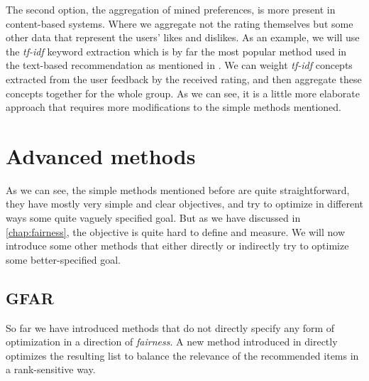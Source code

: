 The second option, the aggregation of mined preferences, is more present in content-based systems. Where we aggregate not the rating themselves but some other data that represent the users' likes and dislikes. As an example, we will use the \textit{tf-idf} keyword extraction which is by far the most popular method used in the text-based recommendation as mentioned in \cite{beel_2016_rs_literature_survey}. We can weight \textit{tf-idf} concepts extracted from the user feedback by the received rating, and then aggregate these concepts together for the whole group. As we can see, it is a little more elaborate approach that requires more modifications to the simple methods mentioned.


\section{Advanced methods}\label{sec:03_advanced_methods}
As we can see, the simple methods mentioned before are quite straightforward, they have mostly very simple and clear objectives, and try to optimize in different ways some quite vaguely specified goal. But as we have discussed in \ref{chap:fairness}, the objective is quite hard to define and measure. We will now introduce some other methods that either directly or indirectly try to optimize some better-specified goal.

\subsection{GFAR} \label{subsec:03_advanced_methods.gfar}
So far we have introduced methods that do not directly specify any form of optimization in a direction of \textit{fairness}. A new method introduced in\cite{GFAR-kaya2020} directly optimizes the resulting list to balance the relevance of the recommended items in a rank-sensitive way.

